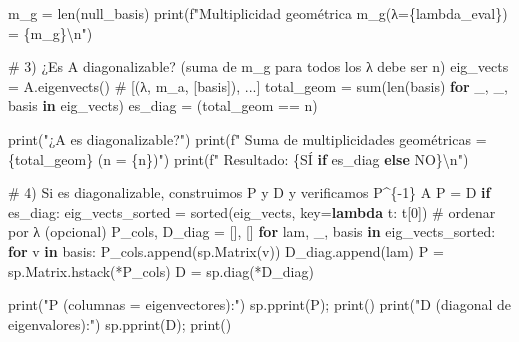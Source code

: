 \documentclass[
  letterpaper,
  DIV=11,
  numbers=noendperiod]{scrreprt}
\newenvironment{Shaded}{\begin{snugshade}}{\end{snugshade}}
\newcommand{\BuiltInTok}[1]{\textcolor[rgb]{0.00,0.23,0.31}{#1}}
\newcommand{\CharTok}[1]{\textcolor[rgb]{0.13,0.47,0.30}{#1}}
\newcommand{\CommentTok}[1]{\textcolor[rgb]{0.37,0.37,0.37}{#1}}
\newcommand{\ControlFlowTok}[1]{\textcolor[rgb]{0.00,0.23,0.31}{\textbf{#1}}}
\newcommand{\DecValTok}[1]{\textcolor[rgb]{0.68,0.00,0.00}{#1}}
\newcommand{\KeywordTok}[1]{\textcolor[rgb]{0.00,0.23,0.31}{\textbf{#1}}}
\newcommand{\NormalTok}[1]{\textcolor[rgb]{0.00,0.23,0.31}{#1}}
\newcommand{\OperatorTok}[1]{\textcolor[rgb]{0.37,0.37,0.37}{#1}}
\newcommand{\SpecialCharTok}[1]{\textcolor[rgb]{0.37,0.37,0.37}{#1}}
\newcommand{\SpecialStringTok}[1]{\textcolor[rgb]{0.13,0.47,0.30}{#1}}
\newcommand{\StringTok}[1]{\textcolor[rgb]{0.13,0.47,0.30}{#1}}
\begin{document}
\begin{Shaded}
\begin{Highlighting}[]
\NormalTok{m\_g }\OperatorTok{=} \BuiltInTok{len}\NormalTok{(null\_basis)}
\BuiltInTok{print}\NormalTok{(}\SpecialStringTok{f"Multiplicidad geométrica m\_g(λ=}\SpecialCharTok{\{}\NormalTok{lambda\_eval}\SpecialCharTok{\}}\SpecialStringTok{) = }\SpecialCharTok{\{}\NormalTok{m\_g}\SpecialCharTok{\}}\CharTok{\textbackslash{}n}\SpecialStringTok{"}\NormalTok{)}

\CommentTok{\# 3) ¿Es A diagonalizable? (suma de m\_g para todos los λ debe ser n)}
\NormalTok{eig\_vects }\OperatorTok{=}\NormalTok{ A.eigenvects()  }\CommentTok{\# [(λ, m\_a, [basis]), ...]}
\NormalTok{total\_geom }\OperatorTok{=} \BuiltInTok{sum}\NormalTok{(}\BuiltInTok{len}\NormalTok{(basis) }\ControlFlowTok{for}\NormalTok{ \_, \_, basis }\KeywordTok{in}\NormalTok{ eig\_vects)}
\NormalTok{es\_diag }\OperatorTok{=}\NormalTok{ (total\_geom }\OperatorTok{==}\NormalTok{ n)}

\BuiltInTok{print}\NormalTok{(}\StringTok{"¿A es diagonalizable?"}\NormalTok{)}
\BuiltInTok{print}\NormalTok{(}\SpecialStringTok{f"  Suma de multiplicidades geométricas = }\SpecialCharTok{\{}\NormalTok{total\_geom}\SpecialCharTok{\}}\SpecialStringTok{ (n = }\SpecialCharTok{\{}\NormalTok{n}\SpecialCharTok{\}}\SpecialStringTok{)"}\NormalTok{)}
\BuiltInTok{print}\NormalTok{(}\SpecialStringTok{f"  Resultado: }\SpecialCharTok{\{}\StringTok{\textquotesingle{}SÍ\textquotesingle{}} \ControlFlowTok{if}\NormalTok{ es\_diag }\ControlFlowTok{else} \StringTok{\textquotesingle{}NO\textquotesingle{}}\SpecialCharTok{\}}\CharTok{\textbackslash{}n}\SpecialStringTok{"}\NormalTok{)}

\CommentTok{\# 4) Si es diagonalizable, construimos P y D y verificamos P\^{}\{{-}1\} A P = D}
\ControlFlowTok{if}\NormalTok{ es\_diag:}
\NormalTok{    eig\_vects\_sorted }\OperatorTok{=} \BuiltInTok{sorted}\NormalTok{(eig\_vects, key}\OperatorTok{=}\KeywordTok{lambda}\NormalTok{ t: t[}\DecValTok{0}\NormalTok{])  }\CommentTok{\# ordenar por λ (opcional)}
\NormalTok{    P\_cols, D\_diag }\OperatorTok{=}\NormalTok{ [], []}
    \ControlFlowTok{for}\NormalTok{ lam, \_, basis }\KeywordTok{in}\NormalTok{ eig\_vects\_sorted:}
        \ControlFlowTok{for}\NormalTok{ v }\KeywordTok{in}\NormalTok{ basis:}
\NormalTok{            P\_cols.append(sp.Matrix(v))}
\NormalTok{            D\_diag.append(lam)}
\NormalTok{    P }\OperatorTok{=}\NormalTok{ sp.Matrix.hstack(}\OperatorTok{*}\NormalTok{P\_cols)}
\NormalTok{    D }\OperatorTok{=}\NormalTok{ sp.diag(}\OperatorTok{*}\NormalTok{D\_diag)}

    \BuiltInTok{print}\NormalTok{(}\StringTok{"P (columnas = eigenvectores):"}\NormalTok{)}
\NormalTok{    sp.pprint(P)}\OperatorTok{;} \BuiltInTok{print}\NormalTok{()}
    \BuiltInTok{print}\NormalTok{(}\StringTok{"D (diagonal de eigenvalores):"}\NormalTok{)}
\NormalTok{    sp.pprint(D)}\OperatorTok{;} \BuiltInTok{print}\NormalTok{()}


\end{Highlighting}
\end{Shaded}
\end{document}
